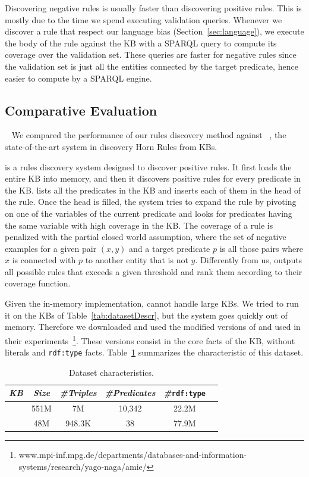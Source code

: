 Discovering negative rules is usually faster than discovering positive rules. This is mostly due to the time we spend executing validation queries. Whenever we discover a rule that respect our language bias (Section~\ref{sec:language}), we execute the body of the rule against the KB with a SPARQL query to compute its coverage over the validation set. These queries are faster for negative rules since the validation set is just all the entities connected by the target predicate, hence easier to compute by a SPARQL engine.


\subsection{Comparative Evaluation} ~\label{sec:comp_evaluation}
We compared the performance of our rules discovery method against \amie~\cite{galarraga2015fast}, the state-of-the-art system in discovery Horn Rules from KBs.

\amie is a rules discovery system designed to discover positive rules. It first loads the entire KB into memory, and then it discovers positive rules for every predicate in the KB. \amie lists all the predicates in the KB and inserts each of them in the head of the rule. Once the head is filled, the system tries to expand the rule by pivoting on one of the variables of the current predicate and looks for predicates having the same variable with high coverage in the KB. The coverage of  a rule is penalized with the partial closed world assumption, where the set of negative examples for a given pair $(x,y)$ and a target predicate $p$ is all those pairs where $x$ is connected with $p$ to another entity that is not $y$. Differently from us, \amie outputs all possible rules that exceeds a given threshold and rank them according to their coverage function.

Given the in-memory implementation, \amie cannot handle large KBs. We tried to run it on the KBs of Table~\ref{tab:datasetDescr}, but the system goes quickly out of memory. Therefore we downloaded and used the modified versions of \yago and \dbpedia used in their experiments~\footnote{www.mpi-inf.mpg.de/departments/databases-and-information-systems/research/yago-naga/amie/}. These versions consist in the core facts of the KB, without literals and \texttt{rdf:type} facts. Table~\ref{tab:AmieDatasetDescr} summarizes the characteristic of this dataset.

\begin{table}[htb]
	\centering
	\caption{\amie Dataset characteristics.}
	\label{tab:AmieDatasetDescr}
	\begin{small}
		\begin{tabular}{|c|c|c|c|c|c|}
			\hline
			\hline
			{\it KB}&{\it Size}&{\it  \#Triples}&{\it \#Predicates}&{\it \#}\texttt{rdf:type}\tabularnewline
			\hline
			\dbpedia & 551M & 7M & 10,342 & 22.2M \tabularnewline
			\yago & 48M & 948.3K & 38 & 77.9M  \tabularnewline
			\hline
		\end{tabular}
	\end{small}
\end{table}

